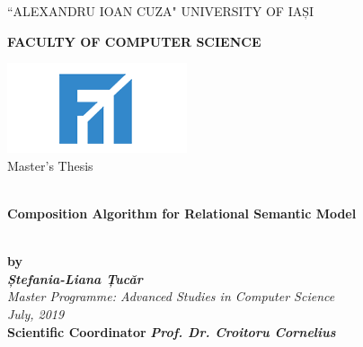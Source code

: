 \documentclass[12pt]{article}
\title{}
\author{}
\theoremstyle{definition}
\begin{document}
\begin{titlepage}
	\begin{center}
		\vspace{1cm}
		``ALEXANDRU IOAN CUZA" UNIVERSITY OF IAȘI
		\
		\\
		\begin{large}
			\textbf{FACULTY OF COMPUTER SCIENCE}\\
		\end{large}	
		\vspace{2.5cm}
		\includegraphics{fii.png}
		\
		\\
		\vspace{1cm}
		Master's Thesis
		\begin{large}
			\
			\\
			\vspace{1.5cm}
			\textbf{Composition Algorithm for Relational Semantic Model}
		\end{large}
		\\
		\vspace{1.5cm}
		\textbf{by}
		\\
		\vspace{1.5cm}
		\textit{\textbf{Ștefania-Liana Țucăr}}
		\\
		\vspace{3cm}
		\textit{Master Programme: Advanced Studies in Computer Science}
		\\
		\textit{July, 2019}
		\\
		\vspace{3cm}
		\textbf{Scientific Coordinator}
		\textit{\textbf{Prof. Dr. Croitoru Cornelius}}
		
		
	\end{center}
\end{titlepage}
\newpage

\tableofcontents
\newpage
\end{document}
